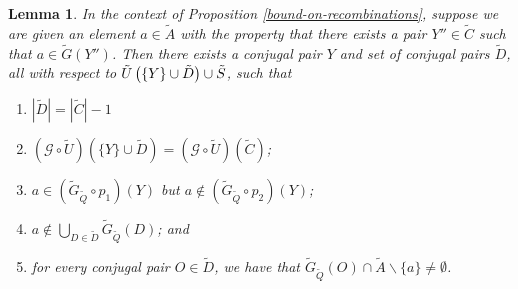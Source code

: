 \documentclass[twocolumn,showpacs,preprintnumbers,amsmath,amssymb,nofootinbib,pra,floatfix]{revtex4-1}
\newtheorem{lemma}{Lemma}
\newcommand{\set}{\tilde}
\newcommand{\genfun}{\mathcal{G}}
\begin{document}
\begin{lemma}
\label{directed-gaussian-elimination-of-logicals}
In the context of Proposition \ref{bound-on-recombinations}, suppose we are given an element $a\in \set A$ with the property that there exists a pair $Y''\in\set C$ such that $a\in\set G(Y'')$. Then there exists a conjugal pair $Y$ and set of conjugal pairs $\set D$, all with respect to $\set U\paren{\{Y\}\cup \set D} \cup \set S$, such that
\begin{enumerate}
\item $|\set D| = |\set C|-1$
\item $(\genfun\circ\set U)(\{Y\}\cup \set D)=(\genfun\circ\set U)(\set C)$;
\item $a\in (\set G_{\set Q}\circ p_1)(Y)$ but $a\notin (\set G_{\set Q}\circ p_2)(Y)$;
\item $a\notin \bigcup_{D\in \set D} \set G_{\set Q}(D)$; and
\item for every conjugal pair $O\in\set D$, we have that $\set G_{\set Q}(O) \cap \set A\backslash \{a\} \ne \emptyset$.
\end{enumerate}
\end{lemma}
\end{document}
